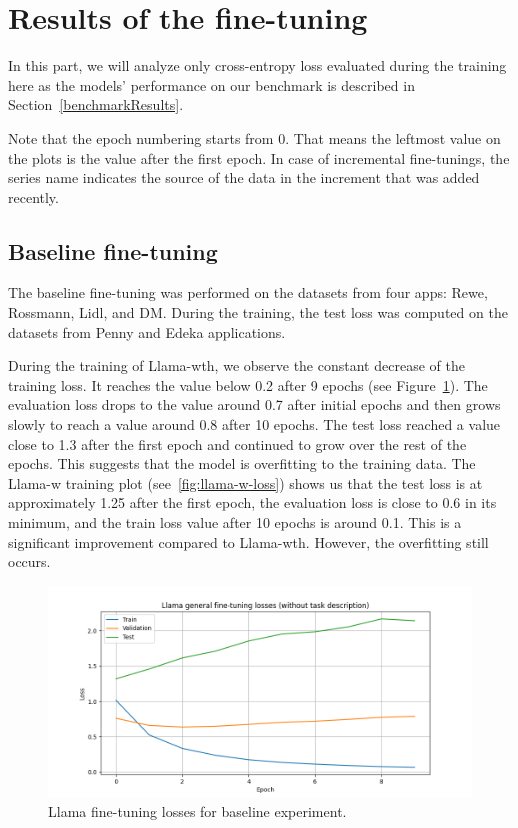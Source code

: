\documentclass[licencjacka,en]{pracamgr}
\begin{document}
\section{Results of the fine-tuning}
In this part, we will analyze only cross-entropy loss evaluated during the training here as the models' performance on our benchmark is described in Section~\ref{benchmarkResults}.

Note that the epoch numbering starts from 0. That means the leftmost value on the plots is the value after the first epoch.
In case of incremental fine-tunings, the series name indicates the source of the data in the increment that was added recently.

\subsection{Baseline fine-tuning}

The baseline fine-tuning was performed on the datasets from four apps: Rewe, Rossmann, Lidl, and DM. During the training, the test loss was computed on the datasets from Penny and Edeka applications.

During the training of Llama-wth, we observe the constant decrease of the training loss. It reaches the value below 0.2 after 9 epochs (see Figure~\ref{fig:llama-wth-loss}). The evaluation loss drops to the value around 0.7 after initial epochs and then grows slowly to reach a value around 0.8 after 10 epochs. The test loss reached a value close to 1.3 after the first epoch and continued to grow over the rest of the epochs. This suggests that the model is overfitting to the training data.
The Llama-w training plot (see~\ref{fig:llama-w-loss}) shows us that the test loss is at approximately 1.25 after the first epoch, the evaluation loss is close to 0.6 in its minimum, and the train loss value after 10 epochs is around 0.1. This is a significant improvement compared to Llama-wth. However, the overfitting still occurs.

\begin{figure}[htbp]
    \centering
    \includegraphics[width=0.8\linewidth]{bachelor_images/llama_ft/llama-wth-loss.png}
    \caption{Llama fine-tuning losses for baseline experiment.}
    \label{fig:llama-wth-loss}
\end{figure}
\end{document}
